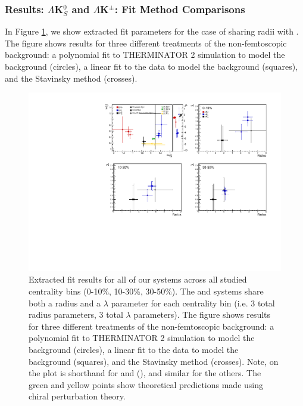 \documentclass[../AnalysisNoteJBuxton.tex]{subfiles}
\begin{document}
\subsubsection{Results: \texorpdfstring{$\Lambda$K$^{0}_{S}$ and $\Lambda$K$^{\pm}$: Fit Method Comparisons}{TEXT}}
\label{ResultsLamK_FitMethComp}

In Figure \ref{fig:FitResults_ShareR_Sharelam_PolyBgd}, we show extracted fit parameters for the case of \LamKchPALamKchM sharing radii with \LamKchMALamKchP.  The figure shows results for three different treatments of the non-femtoscopic background: a polynomial fit to THERMINATOR 2 simulation to model the background (circles), a linear fit to the data to model the background (squares), and the Stavinsky method (crosses).


\begin{figure}[h]
  \centering
  \includegraphics[width=\textwidth]{7_ResultsAndDiscussion/Figures/CompareAllScattParams_CompBgdTreatment_StatOnly.pdf}
  \caption[Fit Results: Shared Radii and THERMINATOR 2 Background]{Extracted fit results for all of our \LamALamKpm systems across all studied centrality bins (0-10\%, 10-30\%, 30-50\%).  The \LamKchPALamKchM and \LamKchMALamKchP systems share both a radius and a $\lambda$ parameter for each centrality bin (i.e. 3 total radius parameters, 3 total $\lambda$ parameters).  The figure shows results for three different treatments of the non-femtoscopic background: a polynomial fit to THERMINATOR 2 simulation to model the background (circles), a linear fit to the data to model the background (squares), and the Stavinsky method (crosses).  Note, \LamKchP on the plot is shorthand for \LamKchP and \ALamKchM (\LamKchPALamKchM), and similar for the others.  The green \cite{Liu:2006xja} and yellow \cite{Mai:2009ce} points show theoretical predictions made using chiral perturbation theory.}
  \label{fig:FitResults_ShareR_Sharelam_PolyBgd}
\end{figure}
\end{document}
